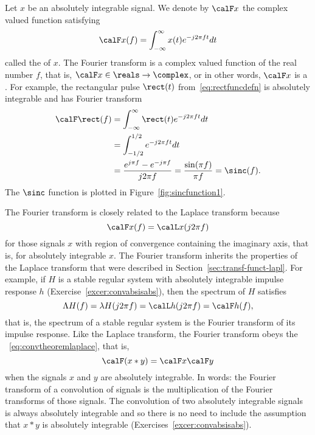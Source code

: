 Let $x$ be an absolutely integrable signal.  We denote by $\calF x$ the complex valued function satisfying
\begin{equation}\label{eq:fouriertransform}
\calF x(f) = \int_{-\infty}^\infty x(t) e^{-j2\pi ft} dt
\end{equation}
called the  of $x$.  The Fourier transform is a complex valued function of the real number $f$, that is, $\calF x \in \reals \to \complex$, or in other words, $\calF x$ is a .  For example, the rectangular pulse $\rect(t)$ from~\eqref{eq:rectfuncdefn} is absolutely integrable and has Fourier transform
\begin{align}
\calF \rect(f) &= \int_{-\infty}^\infty \rect(t) e^{-j2\pi ft} dt \nonumber \\
&= \int_{-1/2}^{1/2} e^{-j2\pi ft} dt \nonumber  \\
&= \frac{e^{j\pi f} - e^{-j\pi f}}{j 2 \pi f} = \frac{\sin(\pi f)}{\pi f} = \sinc(f). \label{eq:sincandrect}
\end{align}
The $\sinc$ function is plotted in Figure~\ref{fig:sincfunction1}.  %

The Fourier transform is closely related to the Laplace transform because
\[
\calF x(f) = \calL x(j 2\pi f)
\]
for those signals $x$ with region of convergence containing the imaginary axis, that is, for absolutely integrable $x$.  The Fourier transform inherits the properties of the Laplace transform that were described in Section~\ref{sec:transf-funct-lapl}.  For example, if $H$ is a stable regular system with absolutely integrable impulse response $h$ (Exercise~\ref{excer:convabsisabs}), then the spectrum of $H$ satisfies
\[
\Lambda H(f) = \lambda H(j2\pi f) = \calL h(j2\pi f) = \calF h(f),
\]
that is, the spectrum of a stable regular system is the Fourier transform of its impulse response.  
 Like the Laplace transform, the Fourier transform obeys the ~\eqref{eq:convtheoremlaplace}, that is,
 \begin{equation}\label{eq:convthmfouriertransform}
 \calF(x * y) = \calF x \calF y
 \end{equation}
when the signals $x$ and $y$ are absolutely integrable.  In words: the Fourier transform of a convolution of signals is the multiplication of the Fourier transforms of those signals.  The convolution of two absolutely integrable signals is always absolutely integrable and so there is no need to include the assumption that $x*y$ is absolutely integrable (Exercises~\ref{excer:convabsisabs}).

